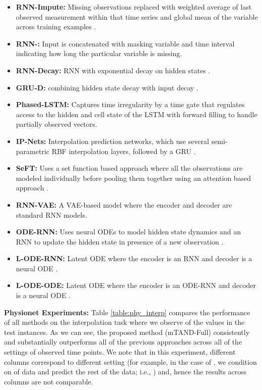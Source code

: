 \begin{itemize}[leftmargin=*]
     \item \textbf{RNN-Impute:} Missing observations replaced with weighted average of last observed measurement within that time series and global mean of the variable across training examples \citep{che2016recurrent}.
     \item \textbf{RNN-:} Input is concatenated with masking variable and time interval  indicating how long the particular variable is missing.
     \item \textbf{RNN-Decay:} RNN with exponential decay on hidden states \citep{mozer2017,che2016recurrent}.
     \item \textbf{GRU-D:} combining hidden state decay with input decay \citep{che2016recurrent}.
     \item \textbf{Phased-LSTM:} Captures time irregularity by a time gate that regulates access to the hidden and cell state of the LSTM \citep{phased2016} with forward filling to handle partially observed vectors. 
     \item \textbf{IP-Nets:} Interpolation prediction networks, which use several semi-parametric RBF interpolation layers, followed by a GRU \citep{shukla2019}.
     \item \textbf{SeFT:} Uses a set function based approach where all the observations are modeled individually before pooling them together using an attention based approach \citep{seft}.
     \item \textbf{RNN-VAE:} A VAE-based model where the encoder and decoder are standard RNN models. 
     \item \textbf{ODE-RNN:} Uses neural ODEs to model hidden state dynamics and an RNN to update the hidden state in presence of a new observation \citep{Rubanova2019}.
    \item \textbf{L-ODE-RNN:}  Latent ODE where the encoder is an RNN and decoder is a neural ODE \citep{neural_ode2018}. 
    \item \textbf{L-ODE-ODE:} Latent ODE where the encoder is an ODE-RNN and decoder is a neural ODE \citep{Rubanova2019}.
\end{itemize}

\textbf{Physionet Experiments:}
Table \ref{table:phy_interp} compares the performance of all methods on the interpolation task where we observe  of the values in the test instances.
As we can see, the proposed method (mTAND-Full) consistently and substantially outperforms all of the previous approaches across all of the settings of observed time points. We note that in this experiment, different columns correspond to different setting (for example, in the case of , we condition on  of data and predict the rest of the data; i.e., ) and, hence the results across columns are not comparable. 


